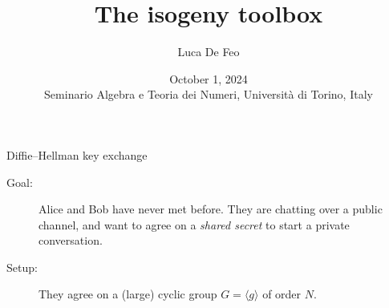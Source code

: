 \documentclass[aspectratio=169]{beamer}
\title{The isogeny toolbox}
\author{Luca De Feo}
\date[October 1, 2024, Uni Torino]{October 1, 2024\\
  Seminario Algebra e Teoria dei Numeri, Università di Torino, Italy}
\institute{IBM Research Zürich}
\newcommand{\Z}{ℤ}
\begin{document}
\frame[plain]{\titlepage}


\begin{frame}{Diffie--Hellman key exchange}
  \begin{description}
  \item[Goal:] Alice and Bob have never met before. They are chatting
    over a public channel, and want to agree on a \emph{shared secret}
    to start a private conversation.
  \item[Setup:] They agree on a (large) cyclic group
    $G=\langle g\rangle$ of order $N$.
  \end{description}

  \begin{center}
  \end{center}
\end{frame}

\end{document}
